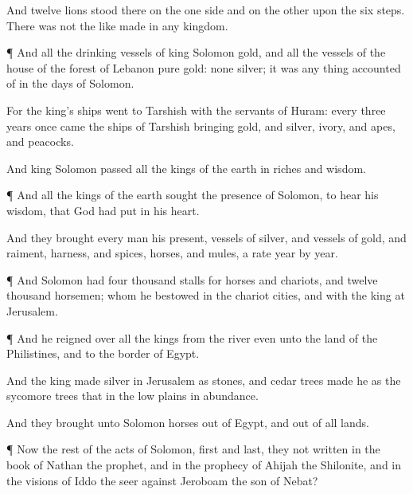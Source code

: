 {And
twelve
lions
stood there on the one side and on the other upon the
six
steps. There was not the like
made in any
kingdom.


\par }{\PP {}¶ And all the
drinking
vessels of
king
Solomon
{}
gold, and all the
vessels of the
house of the
forest of
Lebanon
{}
pure
gold: none
{}
silver; it was
{}
any thing
accounted of in the
days of
Solomon.

For the
king’s
ships
went to
Tarshish with the
servants of
Huram: every
three
years
once
came the
ships of
Tarshish
bringing
gold, and
silver,
ivory, and
apes, and
peacocks.

And
king
Solomon
passed all the
kings of the
earth in
riches and
wisdom.


\par }{\PP {}¶ And all the
kings of the
earth
sought the
presence of
Solomon, to
hear his
wisdom, that
God had
put in his
heart.

And they
brought every
man his
present,
vessels of
silver, and
vessels of
gold, and
raiment,
harness, and
spices,
horses, and
mules, a
rate
year by
year.


\par }{\PP {}¶ And
Solomon had
four
thousand
stalls for
horses and
chariots, and
twelve
thousand
horsemen; whom he
bestowed in the
chariot
cities, and with the
king at
Jerusalem.


\par }{\PP {}¶ And he
reigned over all the
kings from the
river even unto the
land of the
Philistines, and to the
border of
Egypt.

And the
king
made
silver in
Jerusalem as
stones, and cedar
trees
made he as the sycomore
trees that
{} in the low
plains in
abundance.

And they
brought unto
Solomon
horses out of
Egypt, and out of all
lands.


\par }{\PP {}¶ Now the
rest of the
acts of
Solomon,
first and
last,
{} they not
written in the
book of
Nathan the
prophet, and in the
prophecy of
Ahijah the
Shilonite, and in the
visions of
Iddo the
seer against
Jeroboam the
son of
Nebat?

}
